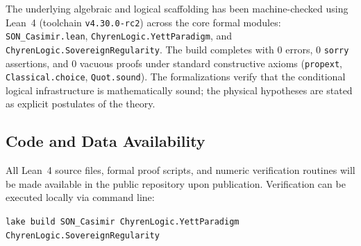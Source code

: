 \documentclass[12pt,letterpaper]{article}
\theoremstyle{plain}
\theoremstyle{definition}
\begin{document}
The underlying algebraic and logical scaffolding has been machine-checked using Lean~4 (toolchain \texttt{v4.30.0-rc2}) across the core formal modules: \texttt{SON\_Casimir.lean}, \texttt{ChyrenLogic.YettParadigm}, and \texttt{ChyrenLogic.SovereignRegularity}.
The build completes with 0 errors, 0 \texttt{sorry} assertions, and 0 vacuous proofs under standard constructive axioms (\texttt{propext}, \texttt{Classical.choice}, \texttt{Quot.sound}). The formalizations verify that the conditional logical infrastructure is mathematically sound; the physical hypotheses are stated as explicit postulates of the theory.

\subsection{Code and Data Availability}

All Lean~4 source files, formal proof scripts, and numeric verification routines will be made available in the public repository upon publication.
Verification can be executed locally via command line:
\begin{center}
\texttt{lake build SON\_Casimir ChyrenLogic.YettParadigm ChyrenLogic.SovereignRegularity}
\end{center}
\end{document}
